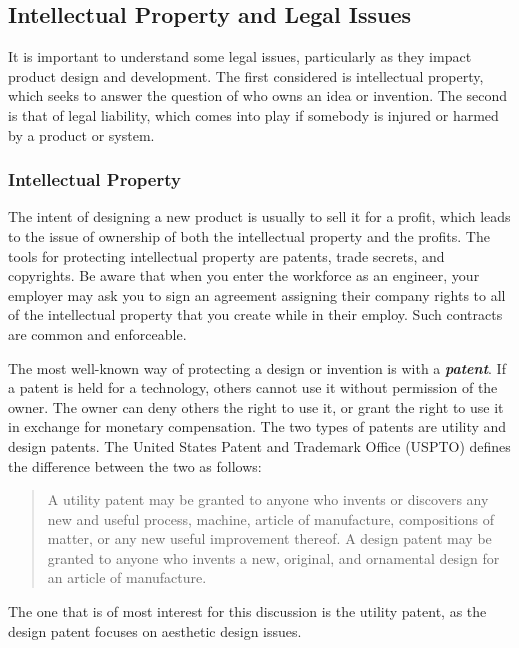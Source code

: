 \subsection{Intellectual Property and Legal
Issues}\label{intellectual-property-and-legal-issues}

It is important to understand some legal issues, particularly as they
impact product design and development. The first considered is
intellectual property, which seeks to answer the question of who owns an
idea or invention. The second is that of legal liability, which comes
into play if somebody is injured or harmed by a product or system.

\subsubsection{Intellectual Property}\label{intellectual-property}

The intent of designing a new product is usually to sell it for a
profit, which leads to the issue of ownership of both the intellectual
property and the profits. The tools for protecting intellectual property
are patents, trade secrets, and copyrights. Be aware that when you enter
the workforce as an engineer, your employer may ask you to sign an
agreement assigning their company rights to all of the intellectual
property that you create while in their employ. Such contracts are
common and enforceable.

The most well-known way of protecting a design or invention is with a
\emph{\textbf{patent}}. If a patent is held for a technology, others
cannot use it without permission of the owner. The owner can deny others
the right to use it, or grant the right to use it in exchange for
monetary compensation. The two types of patents are utility and design
patents. The United States Patent and Trademark Office (USPTO) defines
the difference between the two as follows:

\begin{quote}
A utility patent may be granted to anyone who invents or discovers any
new and useful process, machine, article of manufacture, compositions of
matter, or any new useful improvement thereof. A design patent may be
granted to anyone who invents a new, original, and ornamental design for
an article of manufacture.
\end{quote}

The one that is of most interest for this discussion is the utility
patent, as the design patent focuses on aesthetic design issues.

